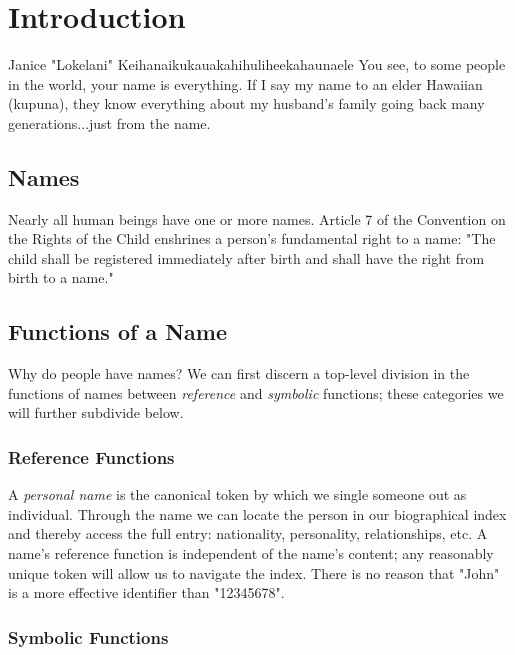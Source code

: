 \section{Introduction}

\begin{aquote}{Janice "Lokelani" Keihanaikukauakahihuliheekahaunaele}
You see, to some people in the world, your name is everything. If I say my name
to an elder Hawaiian (kupuna), they know everything about my husband's family
going back many generations...just from the name.
\end{aquote}

\subsection{Names}

Nearly all human beings have one or more names. Article 7 of the Convention on
the Rights of the Child enshrines a person's fundamental right to a name: "The
child shall be registered immediately after birth and shall have the right from
birth to a name." \parencite{crc}

\subsection{Functions of a Name}

Why do people have names? We can first discern a top-level division in the functions
of names between \textit{reference} and \textit{symbolic} functions; these
categories we will further subdivide below.

\subsubsection{Reference Functions}

A \textit{personal name} is the canonical token by which we single someone out
as individual. Through the name we can locate the person in our biographical
index and thereby access the full entry: nationality, personality,
relationships, etc. A name's reference function is independent of the name's
content; any reasonably unique token will allow us to navigate the index. There
is no reason that "John" is a more effective identifier than "12345678".

\subsubsection{Symbolic Functions}

